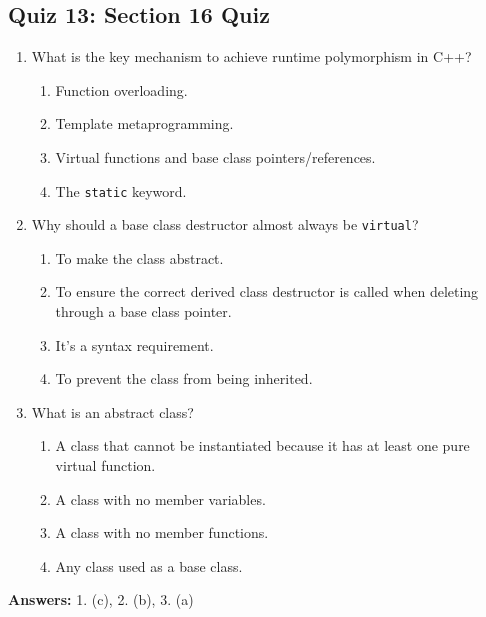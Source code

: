 \subsection{Quiz 13: Section 16 Quiz}
\begin{enumerate}
	\item What is the key mechanism to achieve runtime polymorphism in C++?
	\begin{enumerate}
		\item[a)] Function overloading.
		\item[b)] Template metaprogramming.
		\item[c)] Virtual functions and base class pointers/references.
		\item[d)] The \texttt{static} keyword.
	\end{enumerate}

	\item Why should a base class destructor almost always be \texttt{virtual}?
	\begin{enumerate}
		\item[a)] To make the class abstract.
		\item[b)] To ensure the correct derived class destructor is called when deleting through a base class pointer.
		\item[c)] It's a syntax requirement.
		\item[d)] To prevent the class from being inherited.
	\end{enumerate}

	\item What is an abstract class?
	\begin{enumerate}
		\item[a)] A class that cannot be instantiated because it has at least one pure virtual function.
		\item[b)] A class with no member variables.
		\item[c)] A class with no member functions.
		\item[d)] Any class used as a base class.
	\end{enumerate}
\end{enumerate}

\textbf{Answers:} 1. (c), 2. (b), 3. (a)
